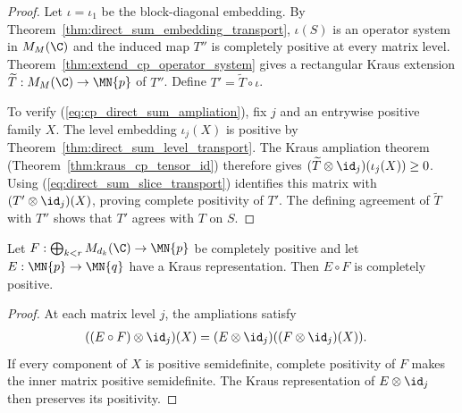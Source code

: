 \begin{proof}\leanok
    Let $\iota=\iota_1$ be the block-diagonal embedding. By
    Theorem~\ref{thm:direct_sum_embedding_transport}, $\iota(S)$ is an
    operator system in $M_M(\C)$ and the induced map $T''$ is completely
    positive at every matrix level. Theorem~\ref{thm:extend_cp_operator_system} gives
    a rectangular Kraus extension $\widetilde T:M_M(\C)\to\MN{p}$ of
    $T''$. Define $T'=\widetilde T\circ\iota$.

    To verify (\ref{eq:cp_direct_sum_ampliation}), fix $j$ and an entrywise
    positive family $X$. The level embedding $\iota_j(X)$ is positive by
    Theorem~\ref{thm:direct_sum_level_transport}. The Kraus ampliation theorem
    (Theorem~\ref{thm:kraus_cp_tensor_id}) therefore gives
    $(\widetilde T\otimes\id_j)(\iota_j(X))\ge0$. Using
    (\ref{eq:direct_sum_slice_transport}) identifies this matrix with
    $(T'\otimes\id_j)(X)$, proving complete positivity of $T'$. The defining
    agreement of $\widetilde T$ with $T''$ shows that $T'$ agrees with $T$ on
    $S$.
\end{proof}

\begin{theorem}
    \label{thm:cp_direct_sum_postcomp_kraus}
    \leanok
    Let $F:\bigoplus_{k<r}M_{d_k}(\C)\to\MN{p}$ be completely positive and
    let $E:\MN{p}\to\MN{q}$ have a Kraus representation. Then $E\circ F$ is
    completely positive.
\end{theorem}

\begin{proof}\leanok
    At each matrix level $j$, the ampliations satisfy
    \begin{align}
        ((E\circ F)\otimes\id_j)(X)
        &=(E\otimes\id_j)((F\otimes\id_j)(X)).
    \end{align}
    If every component of $X$ is positive semidefinite, complete positivity
    of $F$ makes the inner matrix positive semidefinite. The Kraus
    representation of $E\otimes\id_j$ then preserves its positivity.
\end{proof}

